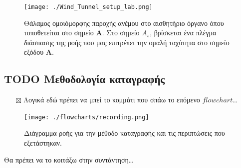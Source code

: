 \documentclass[breaklines=true, 12pt]{article}
\begin{document}
{{{\begin{figure}[htbp]
\centering
\texttt{[image: ./Wind\_Tunnel\_setup\_lab.png]}
\caption{Θάλαμος ομοιόμορφης παροχής ανέμου στο αισθητήριο όργανο όπου τοποθετείται στο σημείο \textbf{Α}. Στο σημείο  \textbf{\(A_{s}\)}, βρίσκεται ένα πλέγμα διάσπασης της ροής που μας επιτρέπει την ομαλή ταχύτητα στο σημείο εξόδου \textbf{A}.}
\end{figure}
\subsection{{\bfseries\sffamily TODO} Μεθοδολογία καταγραφής}
\label{sec:org6716ff0}
\begin{itemize}
\item[{$\boxtimes$}] Λογικά εδώ πρέπει να μπεί το κομμάτι που σπάω το επόμενο \(flowchart\)\ldots{}
\end{itemize}
\begin{figure}[htbp]
\centering
\texttt{[image: ./flowcharts/recording.png]}
\caption{Διάγραμμα ροής για την μέθοδο καταγραφής και τις περιπτώσεις που εξετάστηκαν.}
\end{figure}

Θα πρέπει να το κοιτάξω στην συντάντηση\ldots{}
}}}
\end{document}
